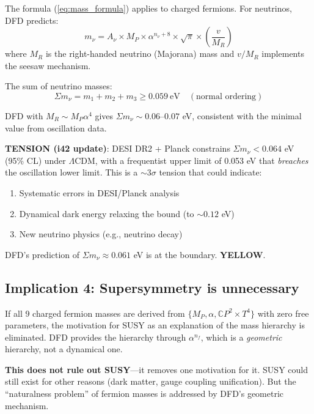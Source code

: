 \documentclass[11pt,a4paper]{article}
\newcommand{\YELLOW}{\textcolor{dfdyellow}{\textbf{YELLOW}}}
\newcommand{\CP}{\mathbb{C}P}
\begin{document}
The formula (\ref{eq:mass_formula}) applies to charged fermions. For neutrinos, DFD predicts:
\begin{equation}
m_\nu = A_\nu \times M_P \times \alpha^{n_\nu + 8} \times \sqrt{\pi} \times \left(\frac{v}{M_R}\right)
\end{equation}
where $M_R$ is the right-handed neutrino (Majorana) mass and $v/M_R$ implements the seesaw mechanism.

The sum of neutrino masses:
\begin{equation}
\Sigma m_\nu = m_1 + m_2 + m_3 \geq 0.059~\text{eV} \quad (\text{normal ordering})
\end{equation}

DFD with $M_R \sim M_P \alpha^4$ gives $\Sigma m_\nu \sim 0.06$--$0.07$ eV, consistent with the minimal value from oscillation data.

\textbf{TENSION (i42 update)}: DESI DR2 + Planck constrains $\Sigma m_\nu < 0.064$ eV (95\% CL) under $\Lambda$CDM, with a frequentist upper limit of 0.053 eV that \emph{breaches} the oscillation lower limit. This is a $\sim 3\sigma$ tension that could indicate:
\begin{enumerate}
\item Systematic errors in DESI/Planck analysis
\item Dynamical dark energy relaxing the bound (to $\sim 0.12$ eV)
\item New neutrino physics (e.g., neutrino decay)
\end{enumerate}

DFD's prediction of $\Sigma m_\nu \approx 0.061$ eV is at the boundary. \YELLOW{}.

\subsection{Implication 4: Supersymmetry is unnecessary}

If all 9 charged fermion masses are derived from $\{M_P, \alpha, \CP^2 \times T^4\}$ with zero free parameters, the motivation for SUSY as an explanation of the mass hierarchy is eliminated. DFD provides the hierarchy through $\alpha^{n_f}$, which is a \emph{geometric} hierarchy, not a dynamical one.

\textbf{This does not rule out SUSY}---it removes one motivation for it. SUSY could still exist for other reasons (dark matter, gauge coupling unification). But the ``naturalness problem'' of fermion masses is addressed by DFD's geometric mechanism.
\end{document}
